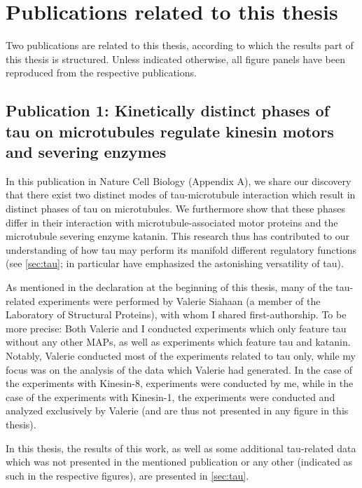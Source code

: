 \chapter{Publications related to this thesis}
\label{chap:publications}
Two publications are related to this thesis, according to which the results part of this thesis is structured. Unless indicated otherwise, all figure panels have been reproduced from the respective publications.

\section{Publication 1: Kinetically distinct phases of tau on microtubules regulate kinesin motors and severing enzymes}
In this publication in Nature Cell Biology \parencite{Siahaan2019a} (Appendix A), we share our discovery that there exist two distinct modes of tau-microtubule interaction which result in distinct phases of tau on microtubules. We furthermore show that these phases differ in their interaction with microtubule-associated motor proteins and the microtubule severing enzyme katanin. This research thus has contributed to our understanding of how tau may perform its manifold different regulatory functions (see \autoref{sec:tau}; \cite{Morris2011b} in particular have emphasized the astonishing versatility of tau). \par

As mentioned in the declaration at the beginning of this thesis, many of the tau-related experiments were performed by Valerie Siahaan (a member of the Laboratory of Structural Proteins), with whom I shared first-authorship. To be more precise: Both Valerie and I conducted experiments which only feature tau without any other MAPs, as well as experiments which feature tau and katanin. Notably, Valerie conducted most of the experiments related to tau only, while my focus was on the analysis of the data which Valerie had generated. In the case of the experiments with Kinesin-8, experiments were conducted by me, while in the case of the experiments with Kinesin-1, the experiments were conducted and analyzed exclusively by Valerie (and are thus not presented in any figure in this thesis). \par

In this thesis, the results of this work, as well as some additional tau-related data which was not presented in the mentioned publication or any other (indicated as such in the respective figures), are presented in \autoref{sec:tau}. 


